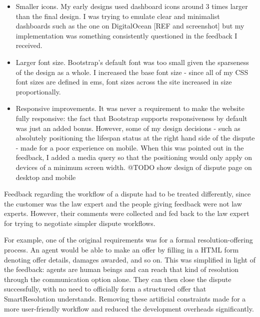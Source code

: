 \begin{itemize}
\item Smaller icons. My early designs used dashboard icons around 3 times larger than the final design. I was trying to emulate clear and minimalist dashboards such as the one on DigitalOcean [REF and screenshot] but my implementation was something consistently questioned in the feedback I received.
\item Larger font size. Bootstrap's default font was too small given the sparseness of the design as a whole. I increased the base font size - since all of my CSS font sizes are defined in ems, font sizes across the site increased in size proportionally.
\item Responsive improvements. It was never a requirement to make the website fully responsive: the fact that Bootstrap supports responsiveness by default was just an added bonus. However, some of my design decisions - such as absolutely positioning the lifespan status at the right hand side of the dispute - made for a poor experience on mobile. When this was pointed out in the feedback, I added a media query so that the positioning would only apply on devices of a minimum screen width. @TODO show design of dispute page on desktop and mobile
\end{itemize}

Feedback regarding the workflow of a dispute had to be treated differently, since the customer was the law expert and the people giving feedback were not law experts. However, their comments were collected and fed back to the law expert for trying to negotiate simpler dispute workflows.

For example, one of the original requirements was for a formal resolution-offering process. An agent would be able to make an offer by filling in a HTML form denoting offer details, damages awarded, and so on. This was simplified in light of the feedback: agents are human beings and can reach that kind of resolution through the communication option alone. They can then close the dispute successfully, with no need to officially form a structured offer that SmartResolution understands. Removing these artificial constraints made for a more user-friendly workflow and reduced the development overheads significantly.